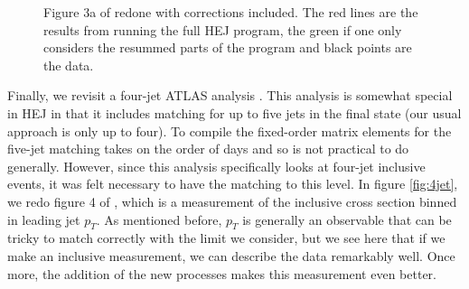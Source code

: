 \begin{figure}[t]
\caption{Figure 3a of \cite{Aad2014} redone with corrections included. The red lines are the results from running the full HEJ program, the green if one only considers the resummed parts of the program and black points are the data.}
\label{fig:newveto3a}
\end{figure}

Finally, we revisit a four-jet ATLAS analysis \cite{Aad2015}. This analysis is somewhat special in HEJ in that it includes matching for up to five jets in the final state (our usual approach is only up to four). To compile the fixed-order matrix elements for the five-jet matching takes on the order of days and so is not practical to do generally. However, since this analysis specifically looks at four-jet inclusive events, it was felt necessary to have the matching to this level. In figure \ref{fig:4jet}, we redo figure 4 of \cite{Aad2015}, which is a measurement of the inclusive cross section binned in leading jet $p_T$. As mentioned before, $p_T$ is generally an observable that can be tricky to match correctly with the limit we consider, but we see here that if we make an inclusive measurement, we can describe the data remarkably well. Once more, the addition of the new processes makes this measurement even better. 

